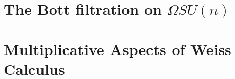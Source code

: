 \documentclass[reqno, oneside]{amsart}
\theoremstyle{definition}
\theoremstyle{plain}
\begin{document}
\begin{comment}
*****
It is through the Beilinson--Drinfeld perspective that we can most easily see the interaction of the Schubert filtration on $Gr_G$ with its $\mathbb{E}_2$-algebra structure.  The key point is the fact (see, e.g., \cite[3.1.14]{Zhu}) that, as points collide in the Beilinson--Drinfeld Grassmannian, the fiber $Gr_{G,\le \mu_1} \times Gr_{G,\le \mu_2}$ degenerates to $Gr_{G, \le \mu_1+\mu_2}$.

That is already enough to prove that, for example, the Schubert filtration on $\Sigma^{\infty}_+ \Omega SU(2)$ described in Example \ref{sl2example} is an $\mathbb{E}_2$-filtered spectrum in the sense of Section \ref{sec:FilGra}.  What we will actually want to be $\mathbb{E}_2$, or at least $\mathbb{A}_\infty$, is the James filtration on $\Sigma^{\infty}_+ \Omega SU(2)$.  In general, it turns out that the Schubert filtration on the Beilinson--Drinfeld Grassmannian for $SL_n(\mathbb{C})$ provides only direct access to every $n$th piece of the Bott filtration on $\Sigma^{\infty}_+ \Omega SL_n(\mathbb{C})$.  We will follow Segal \cite{Segal} and access the Bott filtration on $Gr_{SL_n}$ in a somewhat indirect manner, by considering not $Gr_{SL_n}$ but $Gr_{GL_n}$:
\end{comment}


\section{The Bott filtration on \texorpdfstring{$\Omega SU(n)$}{OmegaSU(n)}} \label{sec:MRFil}

 

\section{Multiplicative Aspects of Weiss Calculus} \label{sec:MultWeiss}


\end{document}
